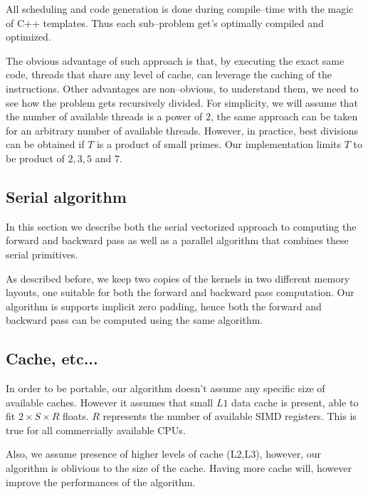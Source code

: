   All scheduling and code generation is done during compile--time with
  the magic of C++ templates.  Thus each sub--problem get's optimally
  compiled and optimized.

  The obvious advantage of such approach is that, by executing the
  exact same code, threads that share any level of cache, can leverage
  the caching of the instructions.  Other advantages are non--obvious,
  to understand them, we need to see how the problem gets recursively
  divided.  For simplicity, we will assume that the number of
  available threads is a power of $2$, the same approach can be taken
  for an arbitrary number of available threads.  However, in practice,
  best divisions can be obtained if $T$ is a product of small primes.
  Our implementation limits $T$ to be product of $2,3,5$ and $7$.


  \subsection{Serial algorithm}

  In this section we describe both the serial vectorized approach to
  computing the forward and backward pass as well as a parallel
  algorithm that combines these serial primitives.

  As described before, we keep two copies of the kernels in two
  different memory layouts, one suitable for both the forward and
  backward pass computation.  Our algorithm is supports implicit zero
  padding, hence both the forward and backward pass can be computed
  using the same algorithm.

  \subsection{Cache, etc...}

  In order to be portable, our algorithm doesn't assume any specific
  size of available caches.  However it assumes that small $L1$ data
  cache is present, able to fit $2 \times S \times R$ floats.  $R$
  represents the number of available SIMD registers.  This is true for
  all commercially available CPUs.

  Also, we assume presence of higher levels of cache (L2,L3), however,
  our algorithm is oblivious to the size of the cache.  Having more
  cache will, however improve the performances of the algorithm.

